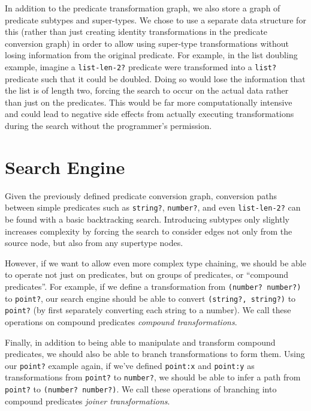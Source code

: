 \documentclass[letterpaper]{article}
\begin{document}
In addition to the predicate transformation graph, we also store a graph of predicate subtypes and super-types.  We chose to use a separate data structure for this (rather than just creating identity transformations in the predicate conversion graph) in order to allow using super-type transformations without losing information from the original predicate.  For example, in the list doubling example, imagine a \texttt{list-len-2?} predicate were transformed into a \texttt{list?} predicate such that it could be doubled.  Doing so would lose the information that the list is of length two, forcing the search to occur on the actual data rather than just on the predicates.  This would be far more computationally intensive and could lead to negative side effects from actually executing transformations during the search without the programmer's permission. 

\section{Search Engine}

Given the previously defined predicate conversion graph, conversion paths between simple predicates such as \texttt{string?}, \texttt{number?}, and even \texttt{list-len-2?} can be found with a basic backtracking search.  Introducing subtypes only slightly increases complexity by forcing the search to consider edges not only from the source node, but also from any supertype nodes.

However, if we want to allow even more complex type chaining, we should be able to operate not just on predicates, but on groups of predicates, or ``compound predicates''.  For example, if we define a transformation from \texttt{(number? number?)} to \texttt{point?}, our search engine should be able to convert \texttt{(string?, string?)} to \texttt{point?} (by first separately converting each string to a number).  We call these operations on compound predicates \textit{compound transformations}.

Finally, in addition to being able to manipulate and transform compound predicates, we should also be able to branch transformations to form them.  Using our \texttt{point?} example again, if we've defined \texttt{point:x} and \texttt{point:y} as transformations from \texttt{point?} to \texttt{number?}, we should be able to infer a path from \texttt{point?} to \texttt{(number? number?)}.  We call these operations of branching into compound predicates \textit{joiner transformations}.
\end{document}
